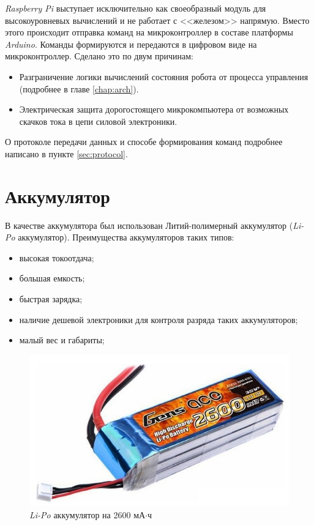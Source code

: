 \textit{Raspberry Pi} выступает исключительно как своеобразный модуль для высокоуровневых вычислений и не работает с <<железом>> напрямую. Вместо этого происходит отправка команд на микроконтроллер в составе платформы \textit{Arduino}. Команды формируются и передаются в цифровом виде на микроконтроллер. Сделано это по двум причинам:
\begin{itemize}
    \item Разграничение логики вычислений состояния робота от процесса управления (подробнее в главе \ref{chap:arch}). %
    \item Электрическая защита дорогостоящего микрокомпьютера от возможных скачков тока в цепи силовой электроники.
\end{itemize}

О протоколе передачи данных и способе формирования команд подробнее написано в пункте \ref{sec:protocol}.

\section{Аккумулятор}
В качестве аккумулятора был использован Литий-полимерный аккумулятор (\textit{Li-Po} аккумулятор). Преимущества аккумуляторов таких типов:
\begin{itemize}
    \item высокая токоотдача;
    \item большая емкость;
    \item быстрая зарядка;
    \item наличие дешевой электроники для контроля разряда таких аккумуляторов;
    \item малый вес и габариты;
\end{itemize}

\begin{figure}[h]
    \centering
    \includegraphics[scale=1]{chapter_mechanics_construction/figure2.png}
    \caption{\textit{Li-Po} аккумулятор на 2600 мА$\cdot$ч}
    \label{}
\end{figure}

